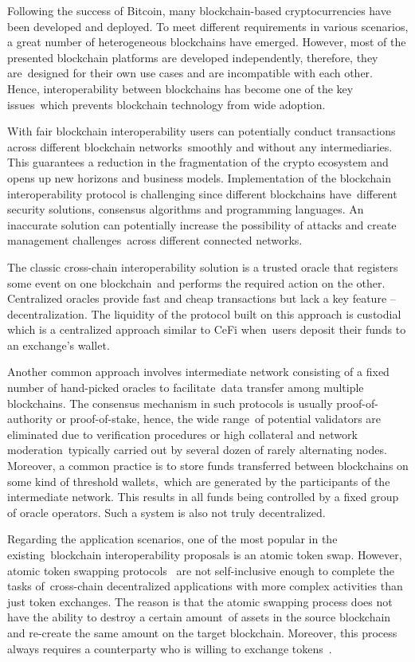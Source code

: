Following the success of Bitcoin, many blockchain-based cryptocurrencies have been developed and deployed.
To meet different requirements in various scenarios, a great number of heterogeneous blockchains have emerged.
However, most of the presented blockchain platforms are developed independently, therefore, they are\
designed for their own use cases and are incompatible with each other.
Hence, interoperability between blockchains has become one of the key issues\
which prevents blockchain technology from wide adoption.

With fair blockchain interoperability users can potentially conduct transactions across different blockchain networks\
smoothly and without any intermediaries.
This guarantees a reduction in the fragmentation of the crypto ecosystem and opens up new horizons and business models.
Implementation of the blockchain interoperability protocol is challenging since different blockchains have\
different security solutions, consensus algorithms and programming languages.
An inaccurate solution can potentially increase the possibility of attacks and create management challenges\
across different connected networks.

The classic cross-chain interoperability solution is a trusted oracle that registers some event on one blockchain\
and performs the required action on the other.
Centralized oracles provide fast and cheap transactions but lack a key feature -- decentralization.
The liquidity of the protocol built on this approach is custodial which is a centralized approach similar to CeFi when\
users deposit their funds to an exchange's wallet.

Another common approach involves intermediate network consisting of a fixed number of hand-picked oracles to facilitate\
data transfer among multiple blockchains.
The consensus mechanism in such protocols is usually proof-of-authority or proof-of-stake, hence, the wide range\
of potential validators are eliminated due to verification procedures or high collateral and network moderation\
typically carried out by several dozen of rarely alternating nodes.
Moreover, a common practice is to store funds transferred between blockchains on some kind of threshold wallets,\
which are generated by the participants of the intermediate network.
This results in all funds being controlled by a fixed group of oracle operators.
Such a system is also not truly decentralized.

Regarding the application scenarios, one of the most popular in the existing\
blockchain interoperability proposals is an atomic token swap.
However, atomic token swapping protocols~\cite{Miraz2019} are not self-inclusive enough to complete the tasks of\
cross-chain decentralized applications with more complex activities than just token exchanges.
The reason is that the atomic swapping process does not have the ability to destroy a certain amount\
of assets in the source blockchain and re-create the same amount on the target blockchain.
Moreover, this process always requires a counterparty who is willing to exchange tokens~\cite{Schulte2019TowardsBI}.

